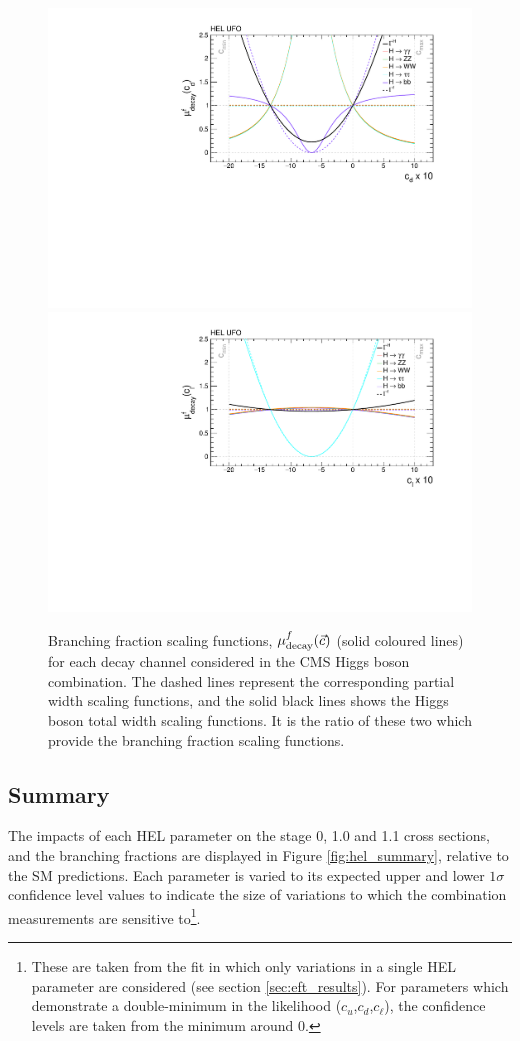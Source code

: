 \begin{figure}[htb!]
  \includegraphics[width=.49\textwidth]{Figures/eft/scaling_functions/decay_vs_cd.pdf}
  \includegraphics[width=.49\textwidth]{Figures/eft/scaling_functions/decay_vs_cl.pdf}
  \caption[HEL branching fraction scaling functions]
  {
    Branching fraction scaling functions, $\mu_{\rm{decay}}^f(\vec{c})$ (solid coloured lines) for each decay channel considered in the CMS Higgs boson combination. The dashed lines represent the corresponding partial width scaling functions, and the solid black lines shows the Higgs boson total width scaling functions. It is the ratio of these two which provide the branching fraction scaling functions.
  }
  \label{fig:eft_decay}
\end{figure}

\subsection{Summary}
The impacts of each HEL parameter on the stage 0, 1.0 and 1.1 cross sections, and the branching fractions are displayed in Figure \ref{fig:hel_summary}, relative to the SM predictions. Each parameter is varied to its expected upper and lower $1\sigma$ confidence level values to indicate the size of variations to which the combination measurements are sensitive to\footnote{These are taken from the fit in which only variations in a single HEL parameter are considered (see section \ref{sec:eft_results}). For parameters which demonstrate a double-minimum in the likelihood ($c_u$,$c_d$,$c_\ell$), the confidence levels are taken from the minimum around 0.}. 

